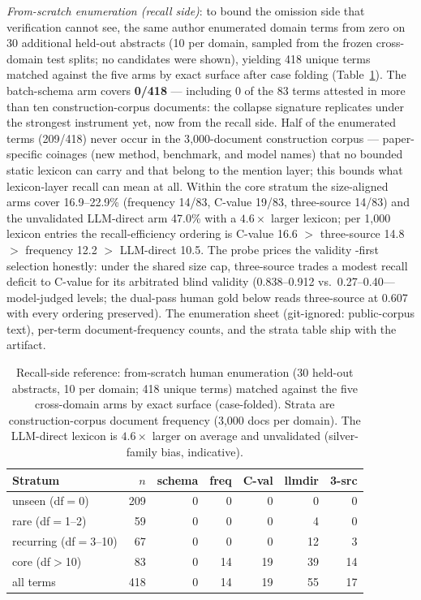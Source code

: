 \documentclass[preprint,12pt]{elsarticle}
\begin{document}
\emph{From-scratch enumeration (recall side)}: to bound the omission
side that verification cannot see, the same author enumerated domain
terms from zero on 30 additional held-out abstracts (10 per domain,
sampled from the frozen cross-domain test splits; no candidates were
shown), yielding 418 unique terms matched against the five arms by
exact surface after case folding (Table~\ref{tab:enum}). The
batch-schema arm covers \textbf{0/418} --- including 0 of the 83 terms
attested in more than ten construction-corpus documents: the collapse
signature replicates under the strongest instrument yet, now from the
recall side. Half of the enumerated terms (209/418) never occur in
the 3{,}000-document construction corpus --- paper-specific coinages
(new method, benchmark, and model names) that no bounded static
lexicon can carry and that belong to the mention layer; this bounds
what lexicon-layer recall can mean at all. Within the core stratum
the size-aligned arms cover 16.9--22.9\% (frequency 14/83, C-value
19/83, three-source 14/83) and the unvalidated LLM-direct arm 47.0\%
with a $4.6\times$ larger lexicon; per 1{,}000 lexicon entries the
recall-efficiency ordering is C-value 16.6 $>$ three-source 14.8 $>$
frequency 12.2 $>$ LLM-direct 10.5. The probe prices the validity
-first selection honestly: under the shared size cap, three-source
trades a modest recall deficit to C-value for its arbitrated blind
validity (0.838--0.912 vs.\ 0.27--0.40---model-judged levels; the
dual-pass human gold below reads three-source at 0.607 with every
ordering preserved). The enumeration sheet
(git-ignored: public-corpus text), per-term document-frequency counts,
and the strata table ship with the artifact.

\begin{table}[t]
\centering
\caption{Recall-side reference: from-scratch human enumeration (30
held-out abstracts, 10 per domain; 418 unique terms) matched against
the five cross-domain arms by exact surface (case-folded). Strata are
construction-corpus document frequency (3{,}000 docs per domain). The
LLM-direct lexicon is $4.6\times$ larger on average and unvalidated
(silver-family bias, indicative).}
\label{tab:enum}
\small
\begin{tabular}{@{}lrrrrrr@{}}
\toprule
Stratum & $n$ & schema & freq & C-val & llmdir & 3-src \\
\midrule
unseen (df$=$0) & 209 & 0 & 0 & 0 & 0 & 0 \\
rare (df$=$1--2) & 59 & 0 & 0 & 0 & 4 & 0 \\
recurring (df$=$3--10) & 67 & 0 & 0 & 0 & 12 & 3 \\
core (df$>$10) & 83 & 0 & 14 & 19 & 39 & 14 \\
\midrule
all terms & 418 & 0 & 14 & 19 & 55 & 17 \\
\bottomrule
\end{tabular}
\end{table}
\end{document}
